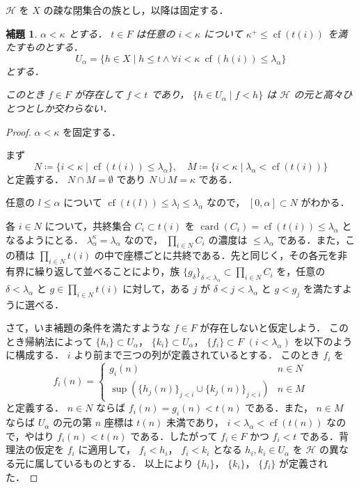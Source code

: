 \documentclass[leqno, 12pt]{ltjsarticle}
\newtheorem{lem}[thm]{補題}
\newcommand{\kappasucc}{\kappa^{+}}
\DeclareMathOperator{\card}{card}
\DeclareMathOperator{\cf}{cf}
\begin{document}
$\mathcal{H}$
を
$X$
の疎な閉集合の族とし，以降は固定する．




\begin{lem}\label{lem:gotcha}
$\alpha<\kappa$
とする．
$t\in F$
は任意の
$i<\kappa$
について
$\kappasucc\le \cf(t(i))$
を満たすものとする．
\[
U_{\alpha}=\{h\in X \mid h\le t\land  \forall i<\kappa\  \cf(h(i))\le \lambda_{\alpha}\}
\]
とする．

このとき
$f\in F$
が存在して
$f<t$
であり，
$\{h\in U_{\alpha} \mid f<h\}$
は
$\mathcal{H}$
の元と高々ひとつとしか交わらない．
\end{lem}
\begin{proof}
$\alpha<\kappa$
を固定する．

まず
\[
N\coloneqq\{i<\kappa \mid \cf(t(i))\le \lambda_{\alpha}\},\quad
M\coloneqq\{i<\kappa \mid \lambda_{\alpha}<\cf(t(i))\}
\]
と定義する．
$N\cap M=\emptyset$
であり
$N\cup M=\kappa$
である．

任意の
$l\le \alpha$
について
$\cf(t(l))\le\lambda_{l}\le\lambda_{\alpha}$
なので，
$[0, \alpha]\subset N$
がわかる．

各
$i\in N$
について，共終集合
$C_{i}\subset t(i)$
を
$\card(C_{i})=\cf(t(i))\le\lambda_{\alpha}$
となるようにとる．
$\lambda_{\alpha}^{\kappa}=\lambda_{\alpha}$
なので，
$\prod_{i\in N}C_{i}$
の濃度は
$\le\lambda_{\alpha}$
である．また，この積は
$\prod_{i\in N}t(i)$
の中で座標ごとに共終である．先と同じく，その各元を非有界に繰り返して並べることにより，族
$\{g_{\delta}\}_{\delta<\lambda_{\alpha}}\subset\prod_{i\in N}C_{i}$
を，任意の
$\delta<\lambda_{\alpha}$
と
$g\in\prod_{i\in N}t(i)$
に対して，ある
$j$
が
$\delta<j<\lambda_{\alpha}$
と
$g<g_{j}$
を満たすように選べる．

さて，いま補題の条件を満たすような
$f\in F$
が存在しないと仮定しよう．
このとき帰納法によって
$\{h_{i}\}\subset U_{\alpha}$，
$\{k_{i}\}\subset U_{\alpha}$，
$\{f_{i}\}\subset F$
$(i<\lambda_{\alpha})$
を以下のように構成する．
$i$
より前まで三つの列が定義されているとする．
このとき
$f_{i}$
を
\[
f_{i}(n)=
	\begin{cases}
	g_{i}(n) &\text{$n\in N$}\\
	\sup(\{h_{j}(n)\}_{j<i}\cup\{k_{j}(n)\}_{j<i}) &\text{$n\in M$}
	\end{cases}
\]
と定義する．
$n\in N$
ならば
$f_{i}(n)=g_{i}(n)<t(n)$
である．また，
$n\in M$
ならば
$U_{\alpha}$
の元の第
$n$
座標は
$t(n)$
未満であり，
$i<\lambda_{\alpha}<\cf(t(n))$
なので，やはり
$f_{i}(n)<t(n)$
である．したがって
$f_{i}\in F$
かつ
$f_{i}<t$
である．背理法の仮定を
$f_{i}$
に適用して，
$f_{i}<h_{i}$，
$f_{i}<k_{i}$
となる
$h_{i}, k_{i}\in U_{\alpha}$
を
$\mathcal{H}$
の異なる元に属しているものとする．
以上により
$\{h_{i}\}$，
$\{k_{i}\}$，
$\{f_{i}\}$
が定義された．


\end{proof}
\end{document}

